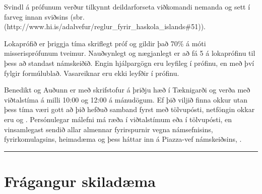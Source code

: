 \documentclass[a4paper,10pt,icelandic]{sphinxmanual}
\begin{document}
Svindl á prófunum verður
tilkynnt deildarforseta viðkomandi nemanda og sett í
farveg innan sviðsins (sbr.
 (http://www.hi.is/adalvefur/reglur\_fyrir\_haskola\_islands\#51)).

Lokaprófið er þriggja tíma skriflegt próf og gildir það 70\% á móti
misserisprófunum tveimur. Nauðsynlegt og nægjanlegt er að fá 5 á
lokaprófinu til þess að standast námskeiðið. Engin hjálpargögn eru
leyfileg í prófinu, en með því fylgir formúlublað.
Vasareiknar eru ekki leyfðir í prófinu.

 Benedikt og Auðunn er með skrifstofur á þriðju hæð í Tæknigarði
og verða með viðtalstíma á milli 10:00 og 12:00 á
mánudögum. Ef þið viljið finna okkur utan þess tíma væri gott að þið
hefðuð samband fyrst með tölvupósti, netföngin okkar eru 
og . Persónulegar málefni má ræða í viðtalstímum eða í
tölvupósti, en vinsamlegast sendið allar almennar fyrirspurnir vegna
námsefnisins, fyrirkomulagsins, heimadæma og þess háttar inn á Piazza-vef
námskeiðsins, .


\bigskip\hrule\bigskip


\newpage


\section{Frágangur skiladæma}
\label{\detokenize{vidauki:fragangur-skiladaema}}\label{\detokenize{vidauki:fragangurskiladaema}}
\end{document}
